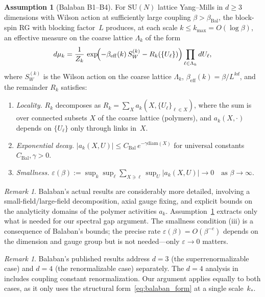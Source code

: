 \documentclass[11pt]{article}
\theoremstyle{definition}
\newtheorem{assumption}[theorem]{Assumption}
\theoremstyle{remark}
\newtheorem{remark}[theorem]{Remark}
\newcommand{\SU}{\mathrm{SU}}
\newcommand{\diam}{\mathrm{diam}}
\begin{document}
\begin{assumption}[Balaban B1--B4]\label{ass:balaban}
For $\SU(N)$ lattice Yang--Mills in $d \geq 3$ dimensions with 
Wilson action at sufficiently large coupling $\beta > \beta_{\mathrm{Bal}}$, 
the block-spin RG with blocking factor~$L$ produces, at each 
scale $k \leq k_{\max} = O(\log\beta)$, an effective measure on 
the coarse lattice $\Lambda_k$ of the form
\begin{equation}\label{eq:balaban_form}
  d\mu_k = \frac{1}{Z_k}\,
  \exp\!\Bigl(-\beta_{\mathrm{eff}}(k)\,S_W^{(k)} 
  - R_k(\{U_\ell\})\Bigr) 
  \prod_{\ell \in \Lambda_k} dU_\ell,
\end{equation}
where $S_W^{(k)}$ is the Wilson action on the coarse lattice 
$\Lambda_k$, $\beta_{\mathrm{eff}}(k) = \beta/L^{kd}$, and the 
remainder $R_k$ satisfies:
\begin{enumerate}[label=\emph{(\roman*)}]
\item \emph{Locality.}  $R_k$ decomposes as 
  $R_k = \sum_{X} a_k(X, \{U_\ell\}_{\ell \in X})$, 
  where the sum is over connected subsets $X$ of the coarse lattice 
  (polymers), and $a_k(X, \cdot)$ depends on $\{U_\ell\}$ only 
  through links in~$X$.
\item \emph{Exponential decay.}  
  $|a_k(X, U)| \leq C_{\mathrm{Bal}} \,e^{-\gamma \diam(X)}$ 
  for universal constants $C_{\mathrm{Bal}}, \gamma > 0$.
\item \emph{Smallness.}  
  $\displaystyle\varepsilon(\beta) := \sup_k \sup_\ell 
  \sum_{X \ni \ell} \sup_U |a_k(X, U)| \longrightarrow 0 
  \quad \text{as } \beta \to \infty.$
\end{enumerate}
\end{assumption}

\begin{remark}
Balaban's actual results are considerably more detailed, involving 
a small-field/large-field decomposition, axial gauge fixing, and 
explicit bounds on the analyticity domains of the polymer 
activities $a_k$.  Assumption~\ref{ass:balaban} extracts only what 
is needed for our spectral gap argument.  The smallness condition 
(iii) is a consequence of Balaban's bounds; the precise rate 
$\varepsilon(\beta) = O(\beta^{-c})$ depends on the dimension and 
gauge group but is not needed---only $\varepsilon \to 0$ matters.
\end{remark}

\begin{remark}
Balaban's published results address $d = 3$ (the superrenormalizable 
case) and $d = 4$ (the renormalizable case) separately.  The $d = 4$ 
analysis in~\cite{Balaban2,Balaban3,Balaban4} includes coupling 
constant renormalization.  Our argument applies equally to both 
cases, as it only uses the structural form~\eqref{eq:balaban_form} 
at a single scale~$k_*$.
\end{remark}
\end{document}
